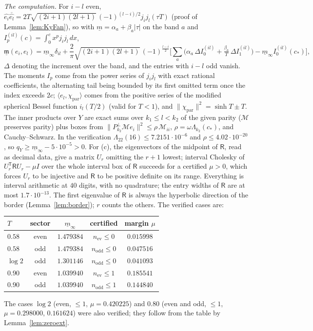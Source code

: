\documentclass[11pt]{amsart}
\theoremstyle{definition}
\theoremstyle{remark}
\begin{document}
\emph{The computation.} For $i-l$ even, $\widehat{e_i}\overline{\widehat{e_l}}=2T\sqrt{(2i+1)(2l+1)}\,
(-1)^{(l-i)/2}j_ij_l(\tau T)$ (proof of Lemma~\ref{lem:KyFan}), so with $\underline m=\alpha_a+\beta_a|\tau|$
on the band $a$ and $I_p^{(il)}(c)=\int_0^cx^pj_ij_l\,dx$,
\[
\underline{\mathfrak m}(e_i,e_l)=\underline m_\infty\delta_{il}+\frac2\pi\sqrt{(2i+1)(2l+1)}\,(-1)^{\frac{l-i}2}
\Big[\sum_a\big(\alpha_a\,\Delta I^{(il)}_0+\tfrac{\beta_a}T\,\Delta I^{(il)}_1\big)-\underline m_\infty I^{(il)}_0(c_*)\Big],
\]
$\Delta$ denoting the increment over the band, and the entries with $i-l$ odd vanish. The moments
$I_p$ come from the power series of $j_ij_l$ with exact rational coefficients, the alternating tail being
bounded by its first omitted term once the index exceeds $2c$; $\langle e_l,\chi_{\mathrm{par}}\rangle$ comes
from the positive series of the modified spherical Bessel function $i_l(T/2)$ (valid for $T<1$), and
$\|\chi_{\mathrm{par}}\|^2=\sinh T\pm T$. The inner products over $Y$ are exact sums over $k_1\le l<k_2$ of
the given parity ($\mathcal M$ preserves parity) plus boxes from
$\|P^\perp_{k_2}\mathcal Me_i\|^2\le\rho\,\mathcal M_{ii}$, $\rho=\omega\Lambda_{k_2}(c_*)$, and
Cauchy--Schwarz. In the verification $\Lambda_{22}(16)\le7.2151\cdot10^{-6}$ and $\rho\le4.02\cdot10^{-20}$, so
$q_Y\ge\underline m_\infty-5\cdot10^{-5}>0$. For (c), the eigenvectors of the midpoint of $\mathsf R$,
read as decimal data, give a matrix $U_r$ omitting the $r+1$ lowest; interval Cholesky of
$U_r^{\mathsf T}\mathsf RU_r-\mu I$ over the whole interval box of $\mathsf R$ succeeds for a certified
$\mu>0$, which forces $U_r$ to be injective and $\mathsf R$ to be positive definite on its range.
Everything is interval arithmetic at $40$ digits, with no quadrature; the entry widths of $\mathsf R$ are
at most $1.7\cdot10^{-13}$. The first eigenvalue of $\mathsf R$ is always the hyperbolic direction of
the border (Lemma~\ref{lem:border}); $r$ counts the others. The verified cases are:
\begin{center}\small
\begin{tabular}{@{}lcccc@{}}
\toprule
$T$ & sector & $\underline m_\infty$ & certified & margin $\mu$\\
\midrule
$0.58$ & even & $1.479384$ & $n_{\mathrm{ev}}\le0$ & $0.015998$\\
$0.58$ & odd & $1.479384$ & $n_{\mathrm{odd}}\le0$ & $0.047516$\\
$\log2$ & odd & $1.301146$ & $n_{\mathrm{odd}}\le0$ & $0.041093$\\
$0.90$ & even & $1.039940$ & $n_{\mathrm{ev}}\le1$ & $0.185541$\\
$0.90$ & odd & $1.039940$ & $n_{\mathrm{odd}}\le1$ & $0.144840$\\
\bottomrule
\end{tabular}
\end{center}
The cases $\log2$ (even, $\le1$, $\mu=0.420225$) and $0.80$ (even and odd, $\le1$,
$\mu=0.298000$, $0.161624$) were also verified; they follow from the table by
Lemma~\ref{lem:zeroext}.
\end{document}
